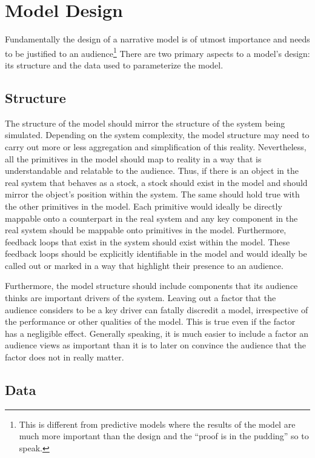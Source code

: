 \documentclass[]{memoir}
\begin{document}
\section{Model Design}

Fundamentally the design of a narrative model is of utmost importance
and needs to be justified to an audience\footnote{This is different from
  predictive models where the results of the model are much more
  important than the design and the ``proof is in the pudding'' so to
  speak.} There are two primary aspects to a model's design: its
structure and the data used to parameterize the model.

\subsection{Structure}

The structure of the model should mirror the structure of the system
being simulated. Depending on the system complexity, the model structure
may need to carry out more or less aggregation and simplification of
this reality. Nevertheless, all the primitives in the model should map
to reality in a way that is understandable and relatable to the
audience. Thus, if there is an object in the real system that behaves as
a stock, a stock should exist in the model and should mirror the
object's position within the system. The same should hold true with the
other primitives in the model. Each primitive would ideally be directly
mappable onto a counterpart in the real system and any key component in
the real system should be mappable onto primitives in the model.
Furthermore, feedback loops that exist in the system should exist within
the model. These feedback loops should be explicitly identifiable in the
model and would ideally be called out or marked in a way that highlight
their presence to an audience.

Furthermore, the model structure should include components that its
audience thinks are important drivers of the system. Leaving out a
factor that the audience considers to be a key driver can fatally
discredit a model, irrespective of the performance or other qualities of
the model. This is true even if the factor has a negligible effect.
Generally speaking, it is much easier to include a factor an audience
views as important than it is to later on convince the audience that the
factor does not in really matter.

\subsection{Data}
\end{document}
